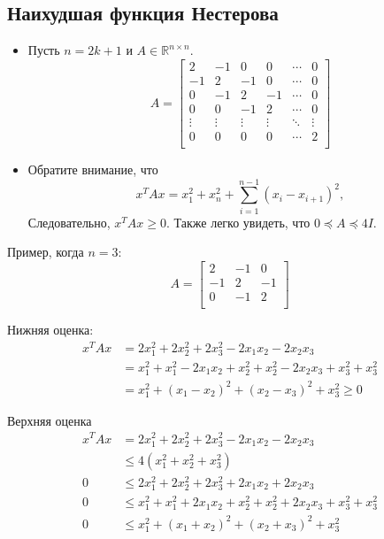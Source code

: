 \documentclass[
  russian,
  letterpaper,
  DIV=11,
  numbers=noendperiod]{scrartcl}
\providecommand{\tightlist}{%
  \setlength{\itemsep}{0pt}\setlength{\parskip}{0pt}}
\begin{document}
\subsection{Наихудшая функция
Нестерова}\label{ux43dux430ux438ux445ux443ux434ux448ux430ux44f-ux444ux443ux43dux43aux446ux438ux44f-ux43dux435ux441ux442ux435ux440ux43eux432ux430}

\begin{itemize}
\tightlist
\item
  Пусть \(n=2k+1\) и \(A \in \mathbb{R}^{n \times n}\). \[
    A = \begin{bmatrix}
        2 & -1 & 0 & 0 & \cdots & 0 \\
        -1 & 2 & -1 & 0 & \cdots & 0 \\
        0 & -1 & 2 & -1  & \cdots & 0 \\
        0 & 0 & -1 & 2  & \cdots & 0 \\
        \vdots & \vdots & \vdots & \vdots & \ddots & \vdots \\
        0 & 0 & 0 & 0 & \cdots & 2  \\
    \end{bmatrix}
    \]
\item
  Обратите внимание, что \[
    x^T A x = x_1^2 + x_n^2 + \sum_{i=1}^{n-1} (x_i - x_{i+1})^2,
    \] Следовательно, \(x^T A x \geq 0\). Также легко увидеть, что
  \(0 \preceq A \preceq 4I\).
\end{itemize}

Пример, когда \(n=3\): \[
A = \begin{bmatrix}
    2 & -1 & 0 \\
    -1 & 2 & -1 \\
    0 & -1 & 2 \\
    \end{bmatrix}
\]

Нижняя оценка: \[
\begin{aligned}
x^T A x &= 2x_1^2 + 2x_2^2 + 2x_3^2 - 2x_1x_2 - 2x_2x_3 \\
&= x_1^2 + x_1^2 - 2x_1x_2 + x_2^2 + x_2^2 - 2x_2x_3 + x_3^2 + x_3^2 \\
&= x_1^2 + (x_1 - x_2)^2 + (x_2 - x_3)^2 + x_3^2 \geq 0
\end{aligned}
\]

Верхняя оценка \[
\begin{aligned}
x^T A x &= 2x_1^2 + 2x_2^2 + 2x_3^2 - 2x_1x_2 - 2x_2x_3\\
& \leq 4(x_1^2 + x_2^2 + x_3^2) \\
0 &\leq 2x_1^2 + 2x_2^2 + 2x_3^2 + 2x_1x_2 + 2x_2x_3 \\
0 &\leq x_1^2 + x_1^2 + 2x_1x_2 + x_2^2 + x_2^2 + 2x_2x_3 + x_3^2 + x_3^2 \\
0 &\leq x_1^2 + (x_1 + x_2)^2 + (x_2 + x_3)^2 + x_3^2
\end{aligned}
\]
\end{document}

